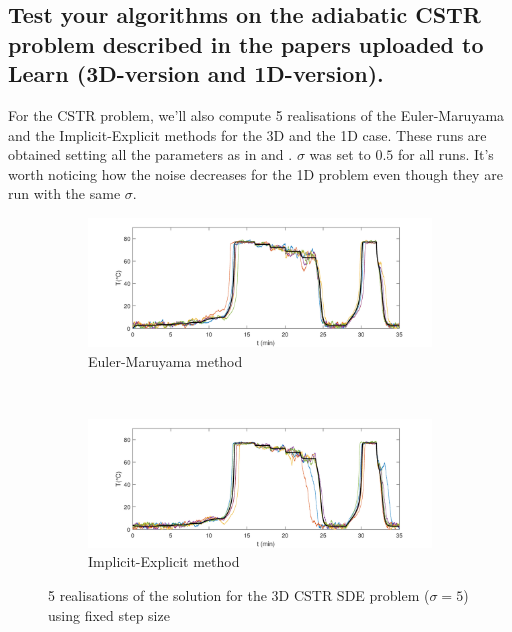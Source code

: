 \subsection{Test  your  algorithms  on  the  adiabatic  CSTR  problem  described  in  the papers uploaded to Learn (3D-version and 1D-version).}
For the CSTR problem, we'll also compute 5 realisations of the Euler-Maruyama and the Implicit-Explicit  methods for the 3D and the 1D case. These runs are obtained setting all the parameters as in \cite{Bagterp1} and \cite{Bagterp2}. $\sigma$ was set to $0.5$ for all runs. It's worth noticing how the noise decreases for the 1D problem even though they are run with the same $\sigma$.

\vspace{3cm}

\begin{figure}[H]
\centering
    \begin{subfigure}{0.8\linewidth}
        \centering
        \includegraphics[width=1\linewidth]{images/4/4_6_EulerMaruyama_3D.pdf} 
        \caption{Euler-Maruyama method}
    \end{subfigure} \\
    \begin{subfigure}{0.8\linewidth}
        \centering
        \includegraphics[width=1\linewidth]{images/4/4_6_ImplicitExplicit_3D.pdf}
        \caption{Implicit-Explicit method}
    \end{subfigure}
    \caption{5 realisations of the solution for the 3D CSTR SDE problem ($\sigma = 5$) using fixed step size}
    \label{4_6_EM_vs_IE_3D}
\end{figure}

